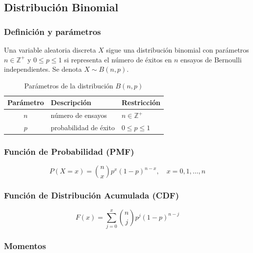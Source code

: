 \subsection{Distribución Binomial}

\subsubsection{Definición y parámetros}

Una variable aleatoria discreta $X$ sigue una distribución binomial con parámetros
$n \in \mathbb{Z}^+$ y $0 \leq p \leq 1$ si representa el número de éxitos en $n$ ensayos
de Bernoulli independientes. Se denota $X \sim B(n, p)$.

\begin{table}[h!]
\centering
\begin{tabular}{|c|l|l|}
\hline
\textbf{Parámetro} & \textbf{Descripción} & \textbf{Restricción} \\
\hline
$n$ & número de ensayos    & $n \in \mathbb{Z}^+$ \\
$p$ & probabilidad de éxito & $0 \leq p \leq 1$ \\
\hline
\end{tabular}
\caption{Parámetros de la distribución $B(n, p)$}
\end{table}

\subsubsection{Función de Probabilidad (PMF)}

\begin{equation}
P(X = x) = \binom{n}{x} p^x (1-p)^{n-x}, \quad x = 0, 1, \ldots, n
\end{equation}

\subsubsection{Función de Distribución Acumulada (CDF)}

\begin{equation}
F(x) = \sum_{j=0}^{x} \binom{n}{j} p^j (1-p)^{n-j}
\end{equation}

\subsubsection{Momentos}


